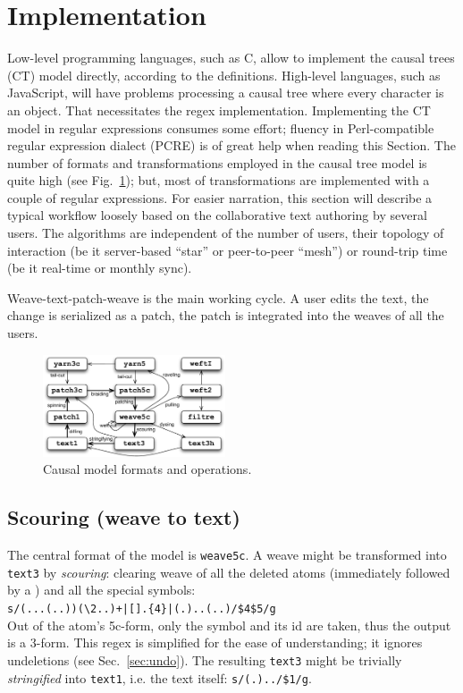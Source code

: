 \documentclass{sig-alternate}
\begin{document}
\section{Implementation}	   \label{sec:algos}

Low-level programming languages, such as C, allow to implement the  causal trees (CT) model directly, according to the definitions.
High-level languages, such as JavaScript, will have problems processing a causal tree where every character is an object.
That necessitates the regex implementation.
Implementing the CT model in regular expressions consumes some effort; fluency in Perl-compatible regular expression dialect (PCRE) is of great help when reading this Section. 
The number of formats and transformations employed in the causal tree model is quite high (see Fig.~\ref{fig:ops}); but, most of transformations are implemented with a couple of regular expressions. 
For easier narration, this section will describe a typical workflow loosely based on the collaborative text authoring by several users. The algorithms are independent of the number of users, their topology of interaction (be it server-based ``star'' or peer-to-peer ``mesh'') or round-trip time (be it real-time or monthly sync).

Weave-text-patch-weave is the main working cycle. A user edits the text, the change is serialized as a patch, the patch is integrated into the weaves of all the users. 

\begin{figure}[t] \label{fig:ops}
\includegraphics[width=0.48\textwidth]{operations.pdf}
\caption{Causal model formats and operations.} \label{fig:ops}
\end{figure}

\subsection{Scouring (weave to text)}
The central format of the model is {\tt weave5c}.
A weave might be transformed into {\tt text3} by \emph{scouring}: clearing weave of all the deleted atoms (immediately followed by a \bsp) and all the special symbols: \\
{\small \verb`s/(...(..))(`\bsp\verb`\2..)+|[`\bsp\zero\verb`].{4}|(.)..(..)/$4$5/g`}\\
Out of the atom's 5c-form, only the symbol and its id are taken, thus the output is a 3-form.
This regex is simplified for the ease of understanding; it ignores undeletions (see Sec.~\ref{sec:undo}).
The resulting {\tt text3} might be trivially \emph{stringified} into {\tt text1}, i.e. the text itself: {\small \verb+s/(.)../$1/g+}.
\end{document}
